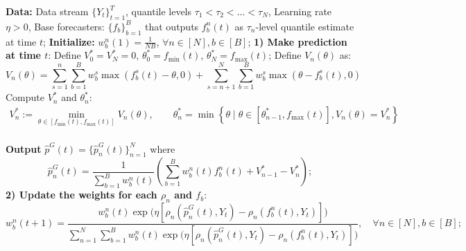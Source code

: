 \begin{algorithm}[h]
    \caption{Two-player game based omniprediction for weighted quantile losses} \label{alg:omni-twoplayer_online_wql}
    \begin{algorithmic}[1]
    \State \textbf{Data:} Data stream $\{Y_t\}_{t=1}^T$, quantile levels $\tau_1 < \tau_2 < ... < \tau_N$, Learning rate $\eta> 0$, Base forecasters: $\{f_b\}_{b=1}^B$ that outputs $f_b^n(t)$ as $\tau_n$-level quantile estimate at time $t$;
    \State \textbf{Initialize:} $w_{b}^n(1) = \frac{1}{NB}$, $\forall n \in [N], b \in [B]$;
      \State \textbf{1) Make prediction at time $t$}:
        \State Define $V_0^* = V_N^* = 0$, $\theta_0^* = f_\text{min}(t)$, $\theta_N^* = f_\text{max}(t)$;
        \State Define $V_n(\theta)$ as:
          \[
          V_n(\theta) = \sum_{s=1}^{n} \sum_{b=1}^B w_b^s \max(f_b^s(t)-\theta, 0) + \sum_{s=n+1}^{N} \sum_{b=1}^B  w_b^s \max(\theta - f_b^s(t), 0)
          \]
        \State Compute $V_n^*$ and $\theta_n^*$:
          \begin{align} \label{eq:Vn_def_wql}
            V_n^* := \min_{\theta \in [f_\text{min}(t), f_\text{max}(t)]} V_n(\theta), \qquad
            \theta_n^* = \min\left\{\theta \mid \theta\in [\theta_{n-1}^*, f_\text{max}(t)],  V_n(\theta) = V_n^* \right\}
          \end{align}
        \EndFor \vspace{-0.2cm}\\
        \State \textbf{Output} $\hat{p}^G(t) = \{\hat{p}^G_n(t)\}_{n=1}^N$ where 
        \[
        \hat{p}^G_n(t) = \frac{1}{\sum_{b=1}^B w_b^n(t)} \left( \sum_{b=1}^B w_b^n(t) f_b^n(t) + V_{n-1}^* - V_n^*  \right);
        \] 
        \State \textbf{2) Update the weights for each $\rho_n$ and $f_b$}:
            \[ 
            w_{b}^n(t+1) 
            = \frac{w_{b}^n(t) \exp\bigl(\eta [\rho_n(\hat{p}^G_n(t), Y_t) - \rho_{n}(f_b^n(t), Y_t)]\bigr)}
            {\sum_{n=1}^N \sum_{b=1}^B w_{b}^n(t) \exp\bigl(\eta [\rho_n(\hat{p}^G_n(t), Y_t) - \rho_{n}(f_b^n(t), Y_t)]\bigr)}, \quad \forall n \in [N], b \in [B];
            \]
    \EndFor
    \end{algorithmic}
\end{algorithm}

